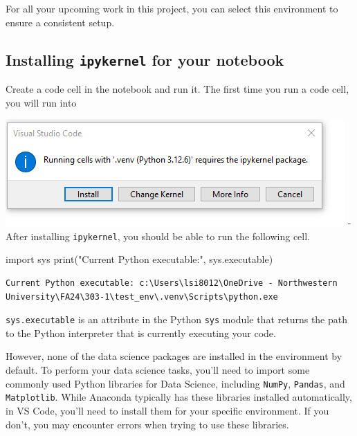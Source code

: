 \documentclass[
  letterpaper,
  DIV=11,
  numbers=noendperiod]{scrreprt}
\newenvironment{Shaded}{\begin{snugshade}}{\end{snugshade}}
\newcommand{\BuiltInTok}[1]{\textcolor[rgb]{0.00,0.23,0.31}{#1}}
\newcommand{\ImportTok}[1]{\textcolor[rgb]{0.00,0.46,0.62}{#1}}
\newcommand{\NormalTok}[1]{\textcolor[rgb]{0.00,0.23,0.31}{#1}}
\newcommand{\StringTok}[1]{\textcolor[rgb]{0.13,0.47,0.30}{#1}}
\begin{document}
For all your upcoming work in this project, you can select this
environment to ensure a consistent setup.

\hypertarget{installing-ipykernel-for-your-notebook}{%
\subsection{\texorpdfstring{Installing \texttt{ipykernel} for your
notebook}{Installing ipykernel for your notebook}}\label{installing-ipykernel-for-your-notebook}}

Create a code cell in the notebook and run it. The first time you run a
code cell, you will run into

\includegraphics{images/ipykernel.png} - After installing
\texttt{ipykernel}, you should be able to run the following cell.

\begin{Shaded}
\begin{Highlighting}[]
\ImportTok{import}\NormalTok{ sys}
\BuiltInTok{print}\NormalTok{(}\StringTok{"Current Python executable:"}\NormalTok{, sys.executable)}
\end{Highlighting}
\end{Shaded}

\begin{verbatim}
Current Python executable: c:\Users\lsi8012\OneDrive - Northwestern University\FA24\303-1\test_env\.venv\Scripts\python.exe
\end{verbatim}

\texttt{sys.executable} is an attribute in the Python \texttt{sys}
module that returns the path to the Python interpreter that is currently
executing your code.

However, none of the data science packages are installed in the
environment by default. To perform your data science tasks, you'll need
to import some commonly used Python libraries for Data Science,
including \texttt{NumPy}, \texttt{Pandas}, and \texttt{Matplotlib}.
While Anaconda typically has these libraries installed automatically, in
VS Code, you'll need to install them for your specific environment. If
you don't, you may encounter errors when trying to use these libraries.
\end{document}
